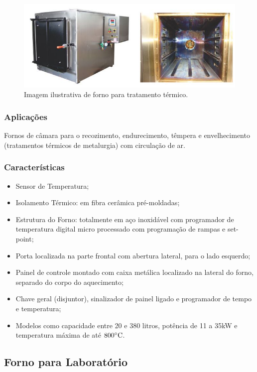 \begin{figure}[!h]
	\centering
	\label{forno_mufla}
	\includegraphics[keepaspectratio=true,scale=0.8]{figuras/forno_mufla.JPG}
	\caption{Imagem ilustrativa de forno para tratamento térmico.}
\end{figure}

\subsubsection{Aplicações}

Fornos de câmara para o recozimento, endurecimento, têmpera e envelhecimento (tratamentos térmicos de metalurgia) com circulação de ar.

\subsubsection{Características}

\begin{itemize}
	\item Sensor de Temperatura;
	\item Isolamento Térmico: em fibra cerâmica pré-moldadas;
	\item Estrutura do Forno: totalmente em aço inoxidável com programador de temperatura digital micro processado com programação de rampas e set-point;
	\item Porta localizada na parte frontal com abertura lateral, para o lado esquerdo;
	\item Painel de controle montado com caixa metálica localizado na lateral do forno, separado do corpo do aquecimento;
	\item Chave geral (disjuntor), sinalizador de painel ligado e programador de tempo e temperatura;
	\item Modelos como capacidade entre 20 e 380 litros, potência de 11 a 35kW e temperatura máxima de até $800 \degree \text{C}$.
\end{itemize}

\subsection{Forno para Laboratório}

